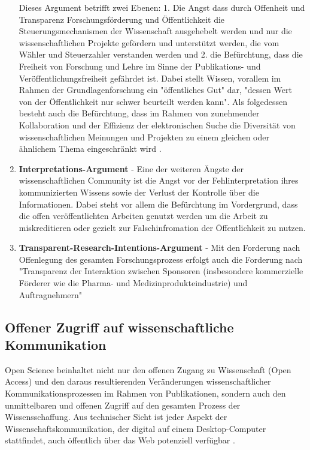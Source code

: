 \begin{enumerate}
Dieses Argument betrifft zwei Ebenen: 1. Die Angst dass durch Offenheit und Transparenz Forschungsförderung und Öffentlichkeit die Steuerungsmechanismen der Wissenschaft ausgehebelt werden und nur die wissenschaftlichen Projekte gefördern und unterstützt werden, die vom Wähler und Steuerzahler verstanden werden und 2. die Befürchtung, dass die Freiheit von Forschung und Lehre im Sinne der Publikations- und Veröffentlichungsfreiheit gefährdet ist\cite{Jochum_2009}. Dabei stellt Wissen, vorallem im Rahmen der Grundlagenforschung ein "öffentliches Gut" dar, "dessen Wert von der Öffentlichkeit nur schwer beurteilt werden kann"\cite{osterloh2008anreize}. Als folgedessen besteht auch die Befürchtung, dass im Rahmen von zunehmender Kollaboration und der Effizienz der elektronischen Suche die Diversität von wissenschaftlichen Meinungen und Projekten zu einem gleichen oder ähnlichem Thema eingeschränkt wird \cite{Evans_2008}.
\item \textbf{Interpretations-Argument} - Eine der weiteren Ängste der wissenschaftlichen Community ist die Angst vor der Fehlinterpretation ihres kommunizierten Wissens sowie der Verlust der Kontrolle über die Informationen\cite{gibbons_1994}. Dabei steht vor allem die Befürchtung im Vordergrund, dass die offen veröffentlichten Arbeiten genutzt werden um die Arbeit zu miskreditieren oder gezielt zur Falschinfromation der Öffentlichkeit zu nutzen.
\item \textbf{Transparent-Research-Intentions-Argument} - Mit den Forderung nach Offenlegung des gesamten Forschungsprozess erfolgt auch die Forderung nach "Transparenz der Interaktion zwischen Sponsoren (insbesondere kommerzielle Förderer wie die Pharma- und Medizinprodukteindustrie) und Auftragnehmern" \cite{Stengel_2013} 
\end{enumerate}

\subsection{Offener Zugriff auf wissenschaftliche Kommunikation}
Open Science beinhaltet nicht nur den offenen Zugang zu Wissenschaft (Open Access) und den daraus resultierenden Veränderungen wissenschaftlicher Kommunikationsprozessen im Rahmen von Publikationen, sondern auch den unmittelbaren und offenen Zugriff auf den gesamten Prozess der Wissensschaffung. Aus technischer Sicht ist jeder Aspekt der Wissenschaftskommunikation, der digital auf einem Desktop-Computer stattfindet, auch öffentlich über das Web potenziell verfügbar \cite{mietchen2012wissenschaft}. 

